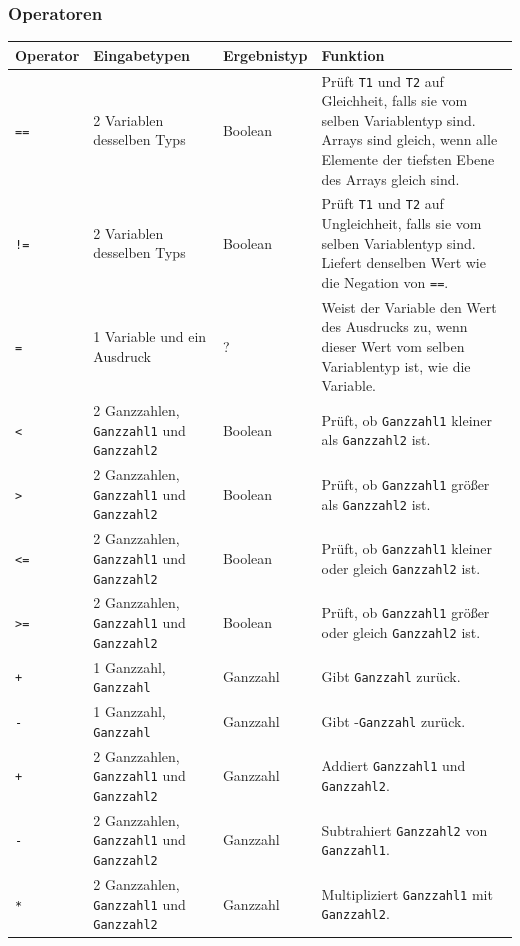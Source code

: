 \documentclass[a4paper,10pt]{article}
\begin{document}
\subsubsection{Operatoren}
\begin{tabularx}{\textwidth}{| l | X | l | X |}
\hline
\textbf{Operator} & \textbf{Eingabetypen} & \textbf{Ergebnistyp} & \textbf{Funktion}\\
\hline
\texttt{==} & 2 Variablen desselben Typs & Boolean & Prüft \texttt{T1} und \texttt{T2} auf Gleichheit, falls sie vom selben Variablentyp sind. Arrays sind gleich, wenn alle Elemente der tiefsten Ebene des Arrays gleich sind.\\
\texttt{!=} & 2 Variablen desselben Typs & Boolean & Prüft \texttt{T1} und \texttt{T2} auf Ungleichheit, falls sie vom selben Variablentyp sind. Liefert denselben Wert wie die Negation von \texttt{==}.\\
\texttt{=} & 1 Variable und ein Ausdruck & ? & Weist der Variable den Wert des Ausdrucks zu, wenn dieser Wert vom selben Variablentyp ist, wie die Variable.\\
\hline
\texttt{<} & 2 Ganzzahlen, \texttt{Ganzzahl1} und \texttt{Ganzzahl2} & Boolean & Prüft, ob \texttt{Ganzzahl1} kleiner als \texttt{Ganzzahl2} ist.\\
\texttt{>} & 2 Ganzzahlen, \texttt{Ganzzahl1} und \texttt{Ganzzahl2} & Boolean & Prüft, ob \texttt{Ganzzahl1} größer als \texttt{Ganzzahl2} ist.\\
\texttt{<=} & 2 Ganzzahlen, \texttt{Ganzzahl1} und \texttt{Ganzzahl2} & Boolean & Prüft, ob \texttt{Ganzzahl1} kleiner oder gleich \texttt{Ganzzahl2} ist.\\
\texttt{>=} & 2 Ganzzahlen, \texttt{Ganzzahl1} und \texttt{Ganzzahl2} & Boolean & Prüft, ob \texttt{Ganzzahl1} größer oder gleich \texttt{Ganzzahl2} ist.\\
\texttt{+} & 1 Ganzzahl, \texttt{Ganzzahl} & Ganzzahl & Gibt \texttt{Ganzzahl} zurück.\\
\texttt{-} & 1 Ganzzahl, \texttt{Ganzzahl} & Ganzzahl & Gibt -\texttt{Ganzzahl} zurück.\\
\texttt{+} & 2 Ganzzahlen, \texttt{Ganzzahl1} und \texttt{Ganzzahl2} & Ganzzahl & Addiert \texttt{Ganzzahl1} und \texttt{Ganzzahl2}.\\
\texttt{-} & 2 Ganzzahlen, \texttt{Ganzzahl1} und \texttt{Ganzzahl2} & Ganzzahl & Subtrahiert \texttt{Ganzzahl2} von \texttt{Ganzzahl1}.\\
\texttt{*} & 2 Ganzzahlen, \texttt{Ganzzahl1} und \texttt{Ganzzahl2} & Ganzzahl & Multipliziert \texttt{Ganzzahl1} mit \texttt{Ganzzahl2}.\\

\end{tabularx}
\end{document}
